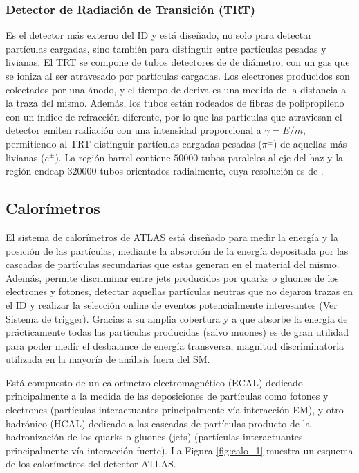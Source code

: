 \subsubsection{Detector de Radiación de Transición (TRT)}

Es el detector más externo del ID y está diseñado, no solo para detectar partículas cargadas, sino también para distinguir entre partículas pesadas y livianas. El TRT se compone de tubos detectores de  de diámetro, con un gas que se ioniza al ser atravesado por partículas cargadas. Los electrones producidos son colectados por una ánodo, y el tiempo de deriva es una medida de la distancia a la traza del mismo. Además, los tubos están rodeados de fibras de polipropileno con un índice de refracción diferente, por lo que las partículas que atraviesan el detector emiten radiación con una intensidad proporcional a $\gamma=E/m$, permitiendo al TRT  distinguir partículas cargadas pesadas ($\pi^{\pm}$) de aquellas más livianas ($e^{\pm}$). La región barrel contiene $50000$ tubos paralelos al eje del haz y la región endcap $320000$ tubos orientados radialmente, cuya resolución es de .

\subsection{Calorímetros}


El sistema de calorímetros de ATLAS está diseñado para medir la energía y la posición de las partículas, mediante la absorción de la energía depositada por las cascadas de partículas secundarias que estas generan en el material del mismo. Además, permite discriminar entre jets producidos por quarks o gluones de los electrones y fotones, detectar aquellas partículas neutras que no dejaron trazas en el ID y realizar la selección online de eventos potencialmente interesantes (Ver Sistema de trigger). Gracias a su amplia cobertura y a que absorbe la energía de prácticamente todas las partículas producidas (salvo muones) es de gran utilidad para poder medir el desbalance de energía transversa, magnitud discriminatoria utilizada en la mayoría de análisis fuera del SM.

Está compuesto de un calorímetro electromagnético (ECAL) dedicado principalmente a la medida de las deposiciones de partículas como fotones y electrones (partículas interactuantes principalmente vía interacción EM), y otro hadrónico (HCAL) dedicado a las cascadas de partículas producto de la hadronización de los quarks o gluones (jets) (partículas interactuantes principalmente vía interacción fuerte). La Figura \ref{fig:calo_1} muestra un esquema de los calorímetros del detector ATLAS.

